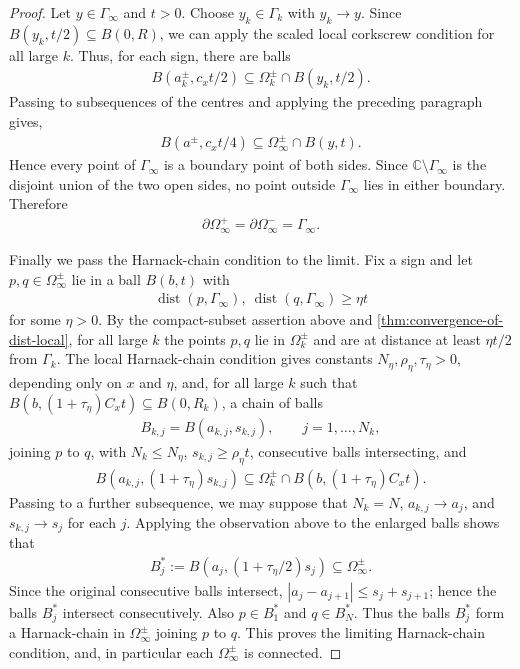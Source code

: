 \documentclass[11pt,a4paper,english,reqno]{amsart}
\numberwithin{equation}{section}
\newcommand{\CC}[0]{\mathbb{C}}
\renewcommand{\subset}{\subseteq}
\DeclareMathOperator{\dist}{dist}
\numberwithin{definition}{section}
\begin{document}
\begin{proof}
    Let $y\in\Gamma_\infty$ and $t>0$.  Choose $y_k\in\Gamma_k$ with $y_k\to y$.
    Since $B(y_k,t/2)\subset B(0,R)$, we can apply the scaled local corkscrew condition for all large $k$.
    Thus, for each sign, there are balls
    \begin{align}
        B(a_k^\pm,c_x t/2)\subset\Omega_k^\pm\cap B(y_k,t/2).
    \end{align}
    Passing to subsequences of the centres and applying the preceding paragraph gives,
    \begin{align}
        B(a^\pm,c_x t/4)\subset\Omega_\infty^\pm\cap B(y,t).
    \end{align}
    Hence every point of $\Gamma_\infty$ is a boundary point of both sides.  Since $\CC\setminus\Gamma_\infty$ is the disjoint union of the two open sides, no point outside $\Gamma_\infty$ lies in either boundary.  Therefore
    \begin{align}
        \partial\Omega_\infty^+=\partial\Omega_\infty^-=\Gamma_\infty .
    \end{align}

    Finally we pass the Harnack-chain condition to the limit.  Fix a sign and let $p,q\in\Omega_\infty^\pm$ lie in a ball $B(b,t)$ with
    \begin{align}
        \dist(p,\Gamma_\infty),\ \dist(q,\Gamma_\infty)\ge \eta t
    \end{align}
    for some $\eta>0$.  By the compact-subset assertion above and \cref{thm:convergence-of-dist-local}, for all large $k$ the points $p,q$ lie in $\Omega_k^\pm$ and are at distance at least $\eta t/2$ from $\Gamma_k$.  The local Harnack-chain condition gives constants $N_\eta,\rho_\eta,\tau_\eta>0$, depending only on $x$ and $\eta$, and, for all large $k$ such that $B(b,(1+τ_η)C_x t)\subset B(0,R_k)$, a chain of balls
    \begin{align}
        B_{k,j}=B(a_{k,j},s_{k,j}),\qquad j=1,\ldots,N_k,
    \end{align}
    joining $p$ to $q$, with $N_k\le N_\eta$, $s_{k,j}\ge\rho_\eta t$, consecutive balls intersecting, and
    \begin{align}
        B(a_{k,j},(1+\tau_\eta)s_{k,j})\subset\Omega_k^\pm\cap B(b,(1+τ_η)C_x t).
    \end{align}
    Passing to a further subsequence, we may suppose that $N_k=N$, $a_{k,j}\to a_j$, and $s_{k,j}\to s_j$ for each $j$.  Applying the observation above to the enlarged balls shows that
    \begin{align}
        B_j^*:=B(a_j,(1+\tau_\eta/2)s_j)\subset\Omega_\infty^\pm .
    \end{align}
    Since the original consecutive balls intersect, $|a_j-a_{j+1}|\le s_j+s_{j+1}$; hence the balls $B_j^*$ intersect consecutively.  Also $p\in B_1^*$ and $q\in B_N^*$.  Thus the balls $B_j^*$ form a Harnack-chain in $\Omega_\infty^\pm$ joining $p$ to $q$.  This proves the limiting Harnack-chain condition,
    and, in particular each $Ω_∞^{\pm}$ is connected.
\end{proof}
\end{document}
